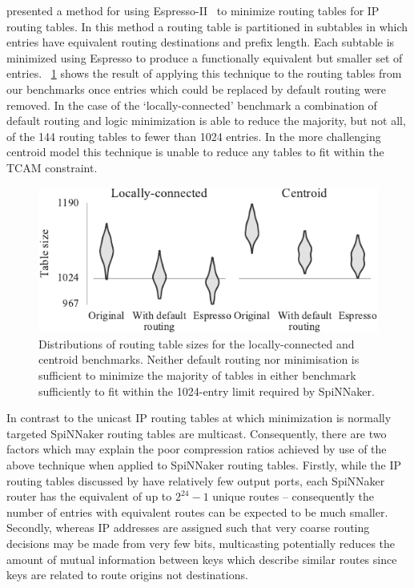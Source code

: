 \documentclass[conference]{IEEEtran}
\begin{document}
\textcite{Liu2002} presented a method for using Espresso-II~\parencite{Brayton1984} to minimize routing tables for IP routing tables.
In this method a routing table is partitioned in subtables in which entries have equivalent routing destinations and prefix length.
Each subtable is minimized using Espresso to produce a functionally equivalent but smaller set of entries.
\figurename~\ref{fig:results/espresso_no_dc} shows the result of applying this technique to the routing tables from our benchmarks once entries which could be replaced by default routing were removed.
In the case of the `locally-connected' benchmark a combination of default routing and logic minimization is able to reduce the majority, but not all, of the 144 routing tables to fewer than 1024 entries.
In the more challenging centroid model this technique is unable to reduce any tables to fit within the TCAM constraint.

\begin{figure}
  \centering
  \includegraphics{experiments/results_no_dc}
  \caption{
    Distributions of routing table sizes for the locally-connected and centroid benchmarks.
    Neither default routing nor minimisation is sufficient to minimize the majority of tables in either benchmark sufficiently to fit within the 1024-entry limit required by SpiNNaker.}
  \label{fig:results/espresso_no_dc}
\end{figure}

In contrast to the unicast IP routing tables at which minimization is normally targeted SpiNNaker routing tables are multicast.
Consequently, there are two factors which may explain the poor compression ratios achieved by use of the above technique when applied to SpiNNaker routing tables.
Firstly, while the IP routing tables discussed by \textcite{Liu2002} have relatively few output ports, each SpiNNaker router has the equivalent of up to $2^{24} - 1$ unique routes -- consequently the number of entries with equivalent routes can be expected to be much smaller.
Secondly, whereas IP addresses are assigned such that very coarse routing decisions may be made from very few bits, multicasting potentially reduces the amount of mutual information between keys which describe similar routes since keys are related to route origins not destinations.
\end{document}

